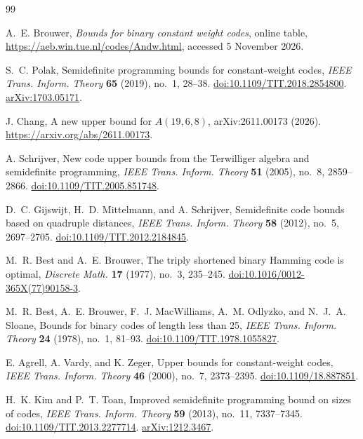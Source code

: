 \documentclass[11pt]{article}
\begin{document}
\begin{thebibliography}{99}

A.~E. Brouwer,
\emph{Bounds for binary constant weight codes}, online table,
\url{https://aeb.win.tue.nl/codes/Andw.html}, accessed 5 November 2026.

S.~C. Polak,
Semidefinite programming bounds for constant-weight codes,
\emph{IEEE Trans. Inform. Theory} \textbf{65} (2019), no.~1, 28--38.
\href{https://doi.org/10.1109/TIT.2018.2854800}{doi:10.1109/TIT.2018.2854800}.
\href{https://arxiv.org/abs/1703.05171}{arXiv:1703.05171}.

J. Chang,
A new upper bound for $A(19,6,8)$,
arXiv:2611.00173 (2026).
\url{https://arxiv.org/abs/2611.00173}.

A. Schrijver,
New code upper bounds from the Terwilliger algebra and semidefinite programming,
\emph{IEEE Trans. Inform. Theory} \textbf{51} (2005), no.~8, 2859--2866.
\href{https://doi.org/10.1109/TIT.2005.851748}{doi:10.1109/TIT.2005.851748}.

D.~C. Gijswijt, H.~D. Mittelmann, and A. Schrijver,
Semidefinite code bounds based on quadruple distances,
\emph{IEEE Trans. Inform. Theory} \textbf{58} (2012), no.~5, 2697--2705.
\href{https://doi.org/10.1109/TIT.2012.2184845}{doi:10.1109/TIT.2012.2184845}.

M.~R. Best and A.~E. Brouwer,
The triply shortened binary Hamming code is optimal,
\emph{Discrete Math.} \textbf{17} (1977), no.~3, 235--245.
\href{https://doi.org/10.1016/0012-365X(77)90158-3}{doi:10.1016/0012-365X(77)90158-3}.

M.~R. Best, A.~E. Brouwer, F.~J. MacWilliams, A.~M. Odlyzko, and N.~J.~A. Sloane,
Bounds for binary codes of length less than 25,
\emph{IEEE Trans. Inform. Theory} \textbf{24} (1978), no.~1, 81--93.
\href{https://doi.org/10.1109/TIT.1978.1055827}{doi:10.1109/TIT.1978.1055827}.

E. Agrell, A. Vardy, and K. Zeger,
Upper bounds for constant-weight codes,
\emph{IEEE Trans. Inform. Theory} \textbf{46} (2000), no.~7, 2373--2395.
\href{https://doi.org/10.1109/18.887851}{doi:10.1109/18.887851}.

H.~K. Kim and P.~T. Toan,
Improved semidefinite programming bound on sizes of codes,
\emph{IEEE Trans. Inform. Theory} \textbf{59} (2013), no.~11, 7337--7345.
\href{https://doi.org/10.1109/TIT.2013.2277714}{doi:10.1109/TIT.2013.2277714}.
\href{https://arxiv.org/abs/1212.3467}{arXiv:1212.3467}.


\end{thebibliography}
\end{document}
